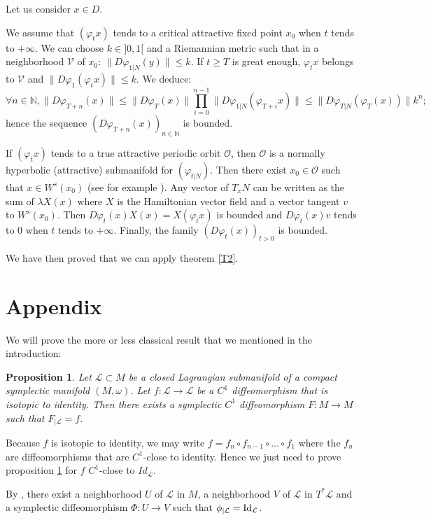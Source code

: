 \documentclass{dcds}
\newtheorem{proposition}{Proposition}
\theoremstyle{definition}
\begin{document}
 Let us consider $x\in D$.

We assume that $(\varphi_tx)$ tends to a critical attractive fixed point $x_0$ when $t$ tends to $+\infty$. We can choose $k\in ]0, 1[$ and a Riemannian metric such that in a neighborhood ${\mathcal {V}}$ of $x_0$: $\|D\varphi_{1|N}(y)\|\leq k$. If $t\geq T$ is great enough, $\varphi_tx$ belongs to ${\mathcal {V}}$ and $\| D\varphi_1(\varphi_tx)\|\leq k$. We deduce:
$$\forall n\in {\mathbb {N}}, \| D\varphi_{T+n}(x)\|\leq \| D\varphi_T(x)\|\prod_{i=0}^{n-1}\| D\varphi_{1|N}(\varphi_{T+i}x)\|\leq \| D\varphi_{T|N}(\varphi_T(x))\|k^n;$$
hence the sequence $(D\varphi_{T+n}(x))_{n\in{\mathbb {N}}}$ is bounded. 

If  $(\varphi_tx)$ tends to a true attractive periodic orbit ${\mathcal {O}}$, then ${\mathcal {O}}$ is a normally hyperbolic (attractive) submanifold for $(\varphi_{t|N})$. Then there exist $x_0\in {\mathcal {O}}$ such that $x\in W^s(x_0)$ (see for example \cite{HPS}). Any vector of $T_xN$ can be written as the sum of $\lambda X(x)$ where $X$ is the Hamiltonian vector field and a vector tangent $v$ to $W^s(x_0)$. Then $D\varphi_t(x)X(x)=X(\varphi_tx)$ is bounded and $D\varphi_t(x)v$ tends to $0$ when $t$ tends to $+\infty$. Finally, the family  $(D\varphi_t(x))_{t>0}$ is bounded.

We have then proved that we can apply theorem \ref{T2}.

\section{Appendix}\label{s4}
We will prove the more or less classical result that we mentioned in the introduction:
\begin{proposition}\label{P4}
Let ${\mathcal {L}}\subset M$ be a closed Lagrangian submanifold of a compact symplectic manifold $(M,\omega)$. Let $f:{\mathcal {L}}\rightarrow {\mathcal {L}}$ be a $C^1$ diffeomorphism that is isotopic to identity. Then there exists a symplectic $C^1$ diffeomorphism $F:M\rightarrow M$ such that $F_{|{\mathcal {L}}}=f$.
\end{proposition}
  Because $f$ is isotopic to identity, we may write $f=f_n\circ f_{n-1}\circ \dots \circ f_1$ where the $f_n$ are diffeomorphisms that are $C^1$-close to identity. Hence we just need to prove proposition \ref{P4} for $f$ $C^1$-close to $Id_{\mathcal {L}}$.

 By \cite{Wei}, there exist a neighborhood $U$ of ${\mathcal {L}}$ in $M$, a neighborhood $V$ of ${\mathcal {L}}$ in $T^*{\mathcal {L}}$ and a symplectic diffeomorphism $\Phi:U\rightarrow V$ such that $\phi_{|{\mathcal {L}}}={\rm Id}_{\mathcal {L}}$.
\end{document}
